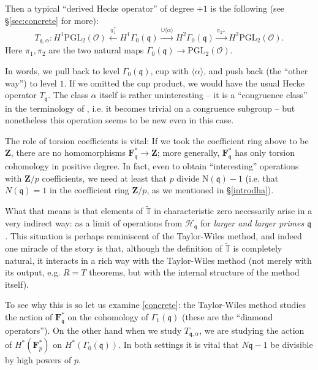 \documentclass[10pt]{amsart}
\newcommand{\Z}{\mathbf{Z}}
\newcommand{\gHecke}{\tilde{\mathbb{T}}}
\newcommand{\OO}{\mathcal{O}}
\newcommand{\PGL}{\mathrm{PGL}}
\theoremstyle{remark}
\begin{document}
 Then a typical ``derived Hecke operator'' 
of degree $+1$ is the following (see \S \ref{sec:concrete} for more): 
\begin{equation} \label{concrete}  T_{\mathfrak{q},\alpha}: H^1 \PGL_2(\OO) \stackrel{\pi_1^*}{\leftarrow}  H^1  \Gamma_0(\mathfrak{q}) \stackrel{\cup \langle \alpha \rangle }{\longrightarrow} H^2 \Gamma_0(\mathfrak{q}) \stackrel{\pi_{2*}}{ \rightarrow}  H^2 \PGL_2(\OO).  \end{equation}
Here  $\pi_1, \pi_2$ are the two natural maps $\Gamma_0(\mathfrak{q}) \rightarrow \PGL_2(\OO)$. 
 
In words,
we pull back to level $\Gamma_0(\mathfrak{q})$, cup with $\langle \alpha \rangle$,  and push back (the ``other way'') to level $1$. 
If we omitted the cup product, we would have the usual Hecke operator $T_{\mathfrak{q}}$.
The class $\alpha$ itself is rather uninteresting -- it is a ``congruence class'' in the terminology of \cite{CaVe}, i.e. it becomes trivial on a  congruence subgroup -- but nonetheless this operation seems to be new even in this case. 

The  role of torsion coefficients is vital:
%
%
If we took the coefficient ring above to be $\Z$,  there are no homomorphisms
$\mathbf{F}_{\mathfrak{q}}^* \rightarrow \Z$; more generally, 
  $\mathbf{F}_{\mathfrak{q}}^*$ has only torsion cohomology in  positive degree. 
  In fact, even to obtain ``interesting'' operations with $\Z/p$ coefficients,
we need at least that $p$ divide $\mathrm{N}(\mathfrak{q})-1$ (i.e. that $N(\mathfrak{q}) =1$ in the coefficient ring $\Z/p$,
as we mentioned in \S \ref{introdha}). 

 


 What that means is that  elements of $\gHecke $ in characteristic zero
 necessarily arise in a very indirect way:
  as a limit of operations from $\mathscr{H}_{\mathfrak{q}}$ for {\em larger and larger primes $\mathfrak{q}$.}  
This situation is perhaps reminiscent of the Taylor-Wiles method,
and indeed one   miracle of the story is that, although the definition of $\gHecke$
is completely natural, it interacts in a rich way with the Taylor-Wiles method (not merely with
its output, e.g. $R=T$ theorems, but with the internal structure of the method itself).   

To see why this is so let us 
 examine  \eqref{concrete}: the Taylor-Wiles method studies the action of 
$\mathbf{F}_{\mathfrak{q}}^*$ on the cohomology of $\Gamma_1(\mathfrak{q})$ (these are the ``diamond operators'').   On the other hand
when we study $T_{\mathfrak{q},\alpha}$, 
 we are studying the action of $H^*(\mathbf{F}_p^*)$ on $H^*(\Gamma_0(\mathfrak{q}))$. In both settings
 it is vital that  $N \mathfrak{q}-1$ be divisible by high powers of $p$.
\end{document}
